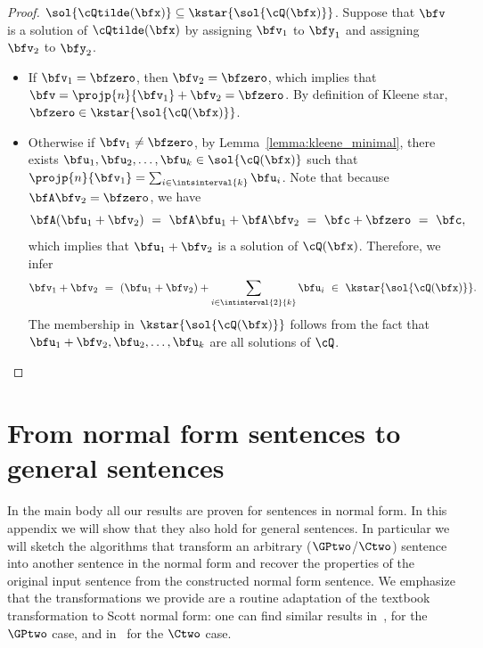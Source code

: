 \begin{proof}
    \uline{$\sol{\cQtilde(\bfx)} \subseteq \kstar{\sol{\cQ(\bfx)}}$}.
    Suppose that $\bfv$ is a solution of $\cQtilde(\bfx)$
    by assigning $\bfv_1$  to $\bfy_1$ and assigning $\bfv_2$ to $\bfy_2$.
    \begin{itemize}
        \item
            If $\bfv_1 = \bfzero$, then $\bfv_2 = \bfzero$,
            which implies that
            $\bfv = \projp{n}{\bfv_1} + \bfv_2 = \bfzero$.
            By definition of Kleene star,
            $\bfzero \in \kstar{\sol{\cQ(\bfx)}}$.
        \item
            Otherwise if $\bfv_1 \neq \bfzero$,
            by Lemma~\ref{lemma:kleene_minimal},
            there exists $\bfu_1, \bfu_2, \ldots, \bfu_k \in \sol{\cQ(\bfx)}$ such that
            $\projp{n}{\bfv_1} = \sum_{i \in \intsinterval{k}} \bfu_i$.
            Note that because $\bfA\bfv_2 = \bfzero$, we have
            \begin{equation*}
                \bfA (\bfu_1 + \bfv_2)
                \ =\ \bfA\bfu_1 + \bfA\bfv_2
                \ =\ \bfc + \bfzero
                \ =\ \bfc,
            \end{equation*}
            which implies that $\bfu_1 + \bfv_2$ is a solution of $\cQ(\bfx)$.
            Therefore, we infer
            \begin{equation*}
                \bfv_1 + \bfv_2
                \ =\ (\bfu_1 + \bfv_2) + \sum_{i \in \intinterval{2}{k}} \bfu_i
                \ \in\ \kstar{\sol{\cQ(\bfx)}}.
            \end{equation*}
            The membership in $\kstar{\sol{\cQ(\bfx)}}$
            follows from the fact that $\bfu_1 + \bfv_2,\bfu_2,\ldots,\bfu_k$ are all solutions of $\cQ$.
    \end{itemize}
\end{proof}

\section{From normal form sentences to general sentences} \label{app:normal}

In the main body all our results are proven for sentences in normal form.
In this appendix we will show that they also hold for general sentences.
In particular we will sketch the algorithms that transform an arbitrary ($\GPtwo$/$\Ctwo$) sentence into another sentence in the normal form and recover the properties of the original input sentence from the constructed normal form sentence.
We emphasize that the transformations we provide are a routine adaptation of the textbook transformation to Scott normal form: one can find similar results 
in~\cite{twovarpres}, for the $\GPtwo$ case,
and in~\cite{ctwocomplexity} for the $\Ctwo$ case.


